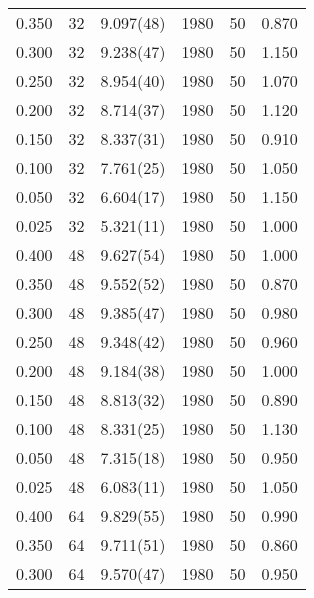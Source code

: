 \begin{tabular}{rrlrrr}
 0.350 &      32 & 9.097(48)  &                 1980 &                   50 &    0.870 \\
 0.300 &      32 & 9.238(47)  &                 1980 &                   50 &    1.150 \\
 0.250 &      32 & 8.954(40)  &                 1980 &                   50 &    1.070 \\
 0.200 &      32 & 8.714(37)  &                 1980 &                   50 &    1.120 \\
 0.150 &      32 & 8.337(31)  &                 1980 &                   50 &    0.910 \\
 0.100 &      32 & 7.761(25)  &                 1980 &                   50 &    1.050 \\
 0.050 &      32 & 6.604(17)  &                 1980 &                   50 &    1.150 \\
 0.025 &      32 & 5.321(11)  &                 1980 &                   50 &    1.000 \\
 0.400 &      48 & 9.627(54)  &                 1980 &                   50 &    1.000 \\
 0.350 &      48 & 9.552(52)  &                 1980 &                   50 &    0.870 \\
 0.300 &      48 & 9.385(47)  &                 1980 &                   50 &    0.980 \\
 0.250 &      48 & 9.348(42)  &                 1980 &                   50 &    0.960 \\
 0.200 &      48 & 9.184(38)  &                 1980 &                   50 &    1.000 \\
 0.150 &      48 & 8.813(32)  &                 1980 &                   50 &    0.890 \\
 0.100 &      48 & 8.331(25)  &                 1980 &                   50 &    1.130 \\
 0.050 &      48 & 7.315(18)  &                 1980 &                   50 &    0.950 \\
 0.025 &      48 & 6.083(11)  &                 1980 &                   50 &    1.050 \\
 0.400 &      64 & 9.829(55)  &                 1980 &                   50 &    0.990 \\
 0.350 &      64 & 9.711(51)  &                 1980 &                   50 &    0.860 \\
 0.300 &      64 & 9.570(47)  &                 1980 &                   50 &    0.950 \\

\end{tabular}

